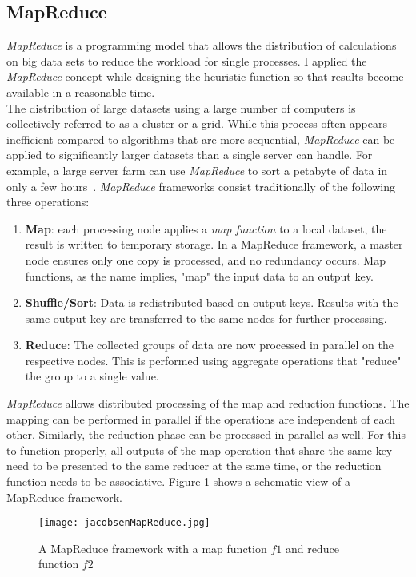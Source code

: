\subsection{MapReduce}
\textit{MapReduce} is a programming model that allows the distribution of calculations on big data sets to reduce the workload for single processes. I applied the \textit{MapReduce} concept while designing the heuristic function so that results become available in a reasonable time.\\
The distribution of large datasets using a large number of computers is collectively referred to as a cluster or a grid. While this process often appears inefficient compared to algorithms that are more sequential, \textit{MapReduce} can be applied to significantly larger datasets than a single server can handle. For example, a large server farm can use \textit{MapReduce} to sort a petabyte of data in only a few hours~\cite{Czajkowski2011}. \textit{MapReduce} frameworks consist traditionally of the following three operations:
\begin{enumerate}
	\item \textbf{Map}: each processing node applies a \textit{map function} to a local dataset, the result is written to temporary storage. In a MapReduce framework, a master node ensures only one copy is processed, and no redundancy occurs. Map functions, as the name implies, "map" the input data to an output key.
	\item \textbf{Shuffle/Sort}: Data is redistributed based on output keys. Results with the same output key are transferred to the same nodes for further processing.
	\item \textbf{Reduce}: The collected groups of data are now processed in parallel on the respective nodes. This is performed using aggregate operations that "reduce" the group to a single value.
\end{enumerate}
\textit{MapReduce} allows distributed processing of the map and reduction functions. The mapping can be performed in parallel if the operations are independent of each other. Similarly, the reduction phase can be processed in parallel as well. For this to function properly, all outputs of the map operation that share the same key need to be presented to the same reducer at the same time, or the reduction function needs to be associative. Figure \ref{fig:mapReduce} shows a schematic view of a MapReduce framework.~\cite{Dean2008}
\begin{figure}
	\centering
	\texttt{[image: jacobsenMapReduce.jpg]}
	\caption{A MapReduce framework with a map function $f1$ and reduce function $f2$~\cite{Dean2008}}
	\label{fig:mapReduce}
\end{figure}
